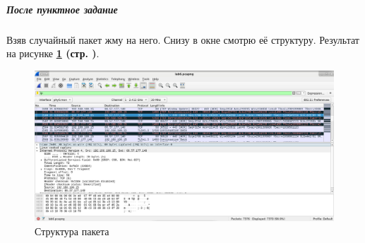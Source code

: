 \subparagraph{После пунктное задание} \hspace{0pt}

Взяв случайный пакет жму на него.
Снизу в окне смотрю её структуру.
Результат на рисунке \textbf{\ref{fig:4-3} (стр. \pageref{fig:4-3})}.

\begin{figure}[!htp]
    \centering
    \includegraphics[width=.99\textwidth]
    {../_INCLUDES/main/task4/4-3.png}
    \caption{Структура пакета}
    \label{fig:4-3}
\end{figure}